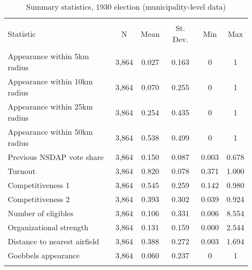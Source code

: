 
\begin{table}[!htbp] \centering 
  \caption{Summary statistics, 1930 election (municipality-level data)} 
  \label{tab:sumstats1930comm} 
\begin{tabular}{@{\extracolsep{5pt}}lccccc} 
\\[-1.8ex]\hline \\[-1.8ex] 
Statistic & \multicolumn{1}{c}{N} & \multicolumn{1}{c}{Mean} & \multicolumn{1}{c}{St. Dev.} & \multicolumn{1}{c}{Min} & \multicolumn{1}{c}{Max} \\ 
\hline \\[-1.8ex] 
Appearance within 5km radius & 3,864 & 0.027 & 0.163 & 0 & 1 \\ 
Appearance within 10km radius & 3,864 & 0.070 & 0.255 & 0 & 1 \\ 
Appearance within 25km radius & 3,864 & 0.254 & 0.435 & 0 & 1 \\ 
Appearance within 50km radius & 3,864 & 0.538 & 0.499 & 0 & 1 \\ 
Previous NSDAP vote share & 3,864 & 0.150 & 0.087 & 0.003 & 0.678 \\ 
Turnout & 3,864 & 0.820 & 0.078 & 0.371 & 1.000 \\ 
Competitiveness 1 & 3,864 & 0.545 & 0.259 & 0.142 & 0.980 \\ 
Competitiveness 2 & 3,864 & 0.393 & 0.302 & 0.039 & 0.924 \\ 
Number of eligibles & 3,864 & 0.106 & 0.331 & 0.006 & 8.554 \\ 
Organizational strength & 3,864 & 0.131 & 0.159 & 0.000 & 2.544 \\ 
Distance to nearest airfield & 3,864 & 0.388 & 0.272 & 0.003 & 1.694 \\ 
Goebbels appearance & 3,864 & 0.060 & 0.237 & 0 & 1 \\ 
\hline \\[-1.8ex] 
\end{tabular} 
\end{table} 

